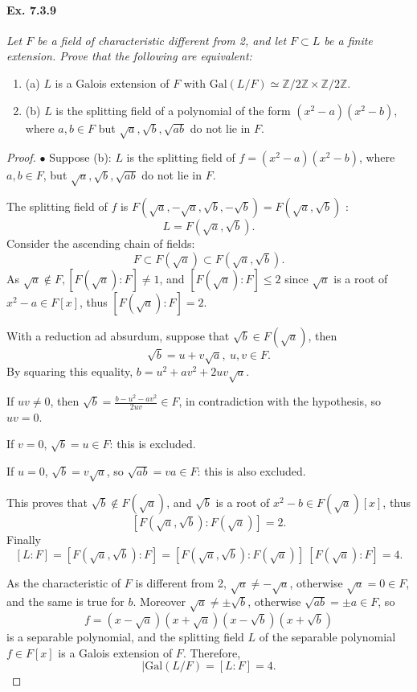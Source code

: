 \documentclass[11pt,a4paper]{article}
\newcommand{\be} {\begin{enumerate}}
\newcommand{\ee} {\end{enumerate}}
\newcommand{\Z}{\mathbb{Z}}
\newcommand{\Gal}{\mathrm{Gal}}
\begin{document}
\paragraph{Ex. 7.3.9}

{\it Let $F$ be a field of characteristic different from 2, and let $F\subset L$ be a finite extension. Prove that the following are equivalent:
\be
\item[(a)] $L$ is a Galois extension of $F$ with $\Gal(L/F)\simeq \Z/2\Z\times \Z/2\Z$.
\item[(b)] $L$ is the splitting field of a polynomial of the form $(x^2-a)(x^2-b)$, where $a,b \in F$ but $\sqrt{a},\sqrt{b},\sqrt{ab}$ do not lie in $F$.
\ee
}

\begin{proof}
$\bullet$ Suppose (b): $L$ is the splitting field of $f=(x^2-a)(x^2-b)$, where $a,b \in F$, but $\sqrt{a},\sqrt{b},\sqrt{ab}$ do not lie in $F$.

The splitting field of $f$ is $F(\sqrt{a}, -\sqrt{a},\sqrt{b},-\sqrt{b}) = F(\sqrt{a},\sqrt{b})$ :
$$L =  F(\sqrt{a},\sqrt{b}).$$
Consider the ascending chain of fields:
$$F \subset F(\sqrt{a}) \subset F(\sqrt{a}, \sqrt{b}).$$
As $\sqrt{a} \not \in F, [ F(\sqrt{a}):F]\neq 1$, and $[ F(\sqrt{a}):F] \leq 2$ since $\sqrt{a}$ is a root of $x^2-a \in F[x]$, thus $[ F(\sqrt{a}):F] = 2$.

With a reduction ad absurdum, suppose that $\sqrt{b} \in F(\sqrt{a})$, then
$$\sqrt{b} = u+v\sqrt{a}, \ u,v \in F.$$
By squaring this equality, $b =u^2+av^2+2uv\sqrt{a}$.

If $uv\neq 0$, then $\sqrt{b} = \frac{b - u^2 -av^2}{2uv} \in F$, in contradiction with the hypothesis, so $uv=0$.

If $v=0$, $\sqrt{b} = u \in F$: this is excluded.

If $u=0$, $\sqrt{b} = v \sqrt{a}$, so $\sqrt{ab} = va \in F$: this is also excluded.

This proves that $\sqrt{b} \not \in F(\sqrt{a})$, and $\sqrt{b}$ is a root of $x^2-b \in F(\sqrt{a})[x]$, thus $$[F(\sqrt{a},\sqrt{b}):F(\sqrt{a})]=2.$$
Finally
$$[L:F] = [F(\sqrt{a},\sqrt{b}):F] = [F(\sqrt{a},\sqrt{b}):F(\sqrt{a})]\ [ F(\sqrt{a}):F] = 4.$$

As the characteristic of $F$ is different from 2, $\sqrt{a} \neq -\sqrt{a}$, otherwise $\sqrt{a}=0 \in F$, and the same is true for $b$. Moreover $\sqrt{a} \ne \pm \sqrt{b}$, otherwise $\sqrt{ab} = \pm a \in F$, so
$$f = (x-\sqrt{a})(x+\sqrt{a})(x-\sqrt{b})(x+\sqrt{b})$$
is a separable polynomial, and the splitting field $L$ of the separable polynomial $f \in F[x]$ is a Galois extension of $F$. Therefore, 
$$\vert \Gal(L/F) = [L:F] = 4.$$


\end{proof}
\end{document}
